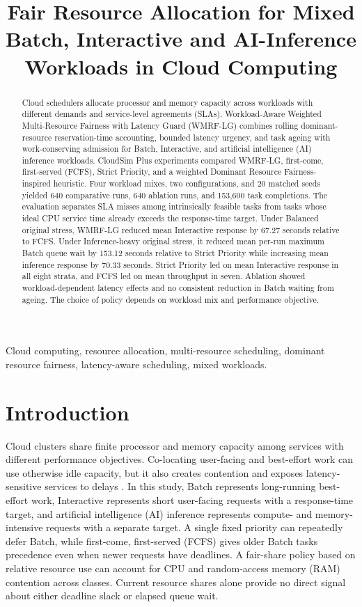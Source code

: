 \documentclass[conference]{IEEEtran}
\title{Fair Resource Allocation for Mixed Batch, Interactive and AI-Inference Workloads in Cloud Computing}
\author{\IEEEauthorblockN{Akshith Veerisetty, Sajja Venkata Naveen, Pitti Aswarth Narayana}
\IEEEauthorblockA{IIIT Sri City}}
\begin{document}
\maketitle

\begin{abstract}
Cloud schedulers allocate processor and memory capacity across workloads with different demands and service-level agreements (SLAs). Workload-Aware Weighted Multi-Resource Fairness with Latency Guard (WMRF-LG) combines rolling dominant-resource reservation-time accounting, bounded latency urgency, and task ageing with work-conserving admission for Batch, Interactive, and artificial intelligence (AI) inference workloads. CloudSim Plus experiments compared WMRF-LG, first-come, first-served (FCFS), Strict Priority, and a weighted Dominant Resource Fairness-inspired heuristic. Four workload mixes, two configurations, and 20 matched seeds yielded 640 comparative runs, 640 ablation runs, and 153,600 task completions. The evaluation separates SLA misses among intrinsically feasible tasks from tasks whose ideal CPU service time already exceeds the response-time target. Under Balanced original stress, WMRF-LG reduced mean Interactive response by 67.27 seconds relative to FCFS. Under Inference-heavy original stress, it reduced mean per-run maximum Batch queue wait by 153.12 seconds relative to Strict Priority while increasing mean inference response by 70.33 seconds. Strict Priority led on mean Interactive response in all eight strata, and FCFS led on mean throughput in seven. Ablation showed workload-dependent latency effects and no consistent reduction in Batch waiting from ageing. The choice of policy depends on workload mix and performance objective.
\end{abstract}

\begin{IEEEkeywords}
Cloud computing, resource allocation, multi-resource scheduling, dominant resource fairness, latency-aware scheduling, mixed workloads.
\end{IEEEkeywords}

\section{Introduction}
Cloud clusters share finite processor and memory capacity among services with different performance objectives. Co-locating user-facing and best-effort work can use otherwise idle capacity, but it also creates contention and exposes latency-sensitive services to delays \cite{verma2015borg,lo2015heracles}. In this study, Batch represents long-running best-effort work, Interactive represents short user-facing requests with a response-time target, and artificial intelligence (AI) inference represents compute- and memory-intensive requests with a separate target. A single fixed priority can repeatedly defer Batch, while first-come, first-served (FCFS) gives older Batch tasks precedence even when newer requests have deadlines. A fair-share policy based on relative resource use can account for CPU and random-access memory (RAM) contention across classes. Current resource shares alone provide no direct signal about either deadline slack or elapsed queue wait.
\end{document}
